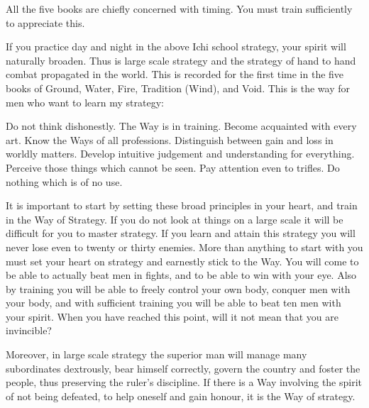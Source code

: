 All the five books are chiefly concerned with timing. You must train sufficiently to appreciate this.

If you practice day and night in the above Ichi school strategy, your spirit will naturally broaden. Thus is large scale strategy and the strategy of hand to hand combat propagated in the world. This is recorded for the first time in the five books of Ground, Water, Fire, Tradition (Wind), and Void. This is the way for men who want to learn my strategy:

    Do not think dishonestly.
    The Way is in training.
    Become acquainted with every art.
    Know the Ways of all professions.
    Distinguish between gain and loss in worldly matters.
    Develop intuitive judgement and understanding for everything.
    Perceive those things which cannot be seen.
    Pay attention even to trifles.
    Do nothing which is of no use. 

It is important to start by setting these broad principles in your heart, and train in the Way of Strategy. If you do not look at things on a large scale it will be difficult for you to master strategy. If you learn and attain this strategy you will never lose even to twenty or thirty enemies. More than anything to start with you must set your heart on strategy and earnestly stick to the Way. You will come to be able to actually beat men in fights, and to be able to win with your eye. Also by training you will be able to freely control your own body, conquer men with your body, and with sufficient training you will be able to beat ten men with your spirit. When you have reached this point, will it not mean that you are invincible?

Moreover, in large scale strategy the superior man will manage many subordinates dextrously, bear himself correctly, govern the country and foster the people, thus preserving the ruler's discipline. If there is a Way involving the spirit of not being defeated, to help oneself and gain honour, it is the Way of strategy. 
